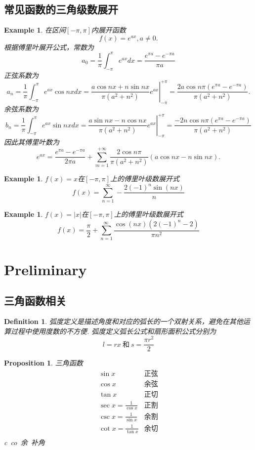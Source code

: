 \documentclass{article}
\newtheorem{proposition}[theorem]{Proposition}
\newtheorem{example}[theorem]{Example}
\newtheorem{definition}[theorem]{Definition}
\begin{document}
\subsection{常见函数的三角级数展开}

\begin{example}
\rm 在区间$[-\pi,\pi]$内展开函数
$$
f(x) = e^{ax}, a\neq 0.
$$
根据傅里叶展开公式，常数为
$$
a_0  = \frac{1}{\pi} \int_{-\pi}^{\pi} e^{ax}dx = \frac{e^{\pi a}-e^{-\pi a}}{\pi a}
$$
正弦系数为
$$
a_n  = \frac{1}{\pi} \int_{-\pi}^{\pi} e^{ax}\cos nxdx = \left. \frac{a\cos nx  + n\sin nx}{\pi(a^2+n^2)}e^{ax} \right|_{-\pi}^{+\pi} = \frac{2a\cos n\pi (e^{\pi a}-e^{-\pi a})}{\pi(a^2+n^2)}. 
$$
余弦系数为
$$
b_n = \frac{1}{\pi} \int_{-\pi}^{\pi} e^{ax}\sin nxdx  = \left. \frac{a\sin nx  - n\cos nx}{\pi(a^2+n^2)}e^{ax} \right|_{-\pi}^{+\pi} = \frac{-2n\cos n\pi (e^{\pi a}-e^{-\pi a})}{\pi(a^2+n^2)}
$$
因此其傅里叶数为
$$
e^{ax} = \frac{e^{\pi a}-e^{-\pi a}}{2\pi a} + \sum\limits_{m=1}^{+\infty} \frac{2\cos n\pi}{\pi(a^2+n^2)}(a\cos nx - n\sin nx). 
$$
\end{example}

\begin{example}
\rm $f(x)=x$在$[-\pi,\pi]$上的傅里叶级数展开式
$$
f(x) = \sum _{n=1}^{\infty }-\frac{2\left(-1\right)^n\sin \left(nx\right)}{n}
$$
\end{example}

\begin{example}
\rm $f(x)=|x|$在$[-\pi,\pi]$上的傅里叶级数展开式
$$
f(x) = \frac{\pi }{2}+\sum _{n=1}^{\infty \:}\frac{\cos \left(nx\right)\left(2\left(-1\right)^n-2\right)}{\pi n^2}
$$
\end{example}

\newpage
\section{Preliminary}

\subsection{三角函数相关}
\begin{definition}
\rm 弧度定义是{\color{red}描述角度和对应的弧长的一个双射关系}，避免在其他运算过程中使用度数的不方便. 弧度定义{\color{red}弧长公式}和{\color{red}扇形面积公式}分别为
$$
l = rx ~\text{和}~ s = \frac{\pi r^2}{2}
$$
\end{definition}

\begin{proposition}
\rm 三角函数
$$
\begin{array}{ll}
\sin x & \text{正弦} \\
\cos x & \text{余弦} \\
\tan x & \text{正切} \\
\sec x = \frac{1}{\cos x} & \text{正割} \\
\csc x = \frac{1}{\sin x} & \text{余割} \\
\cot x = \frac{1}{\tan x} & \text{余切} \\
\end{array}
$$
c~co~余~补角
\end{proposition}
\end{document}
